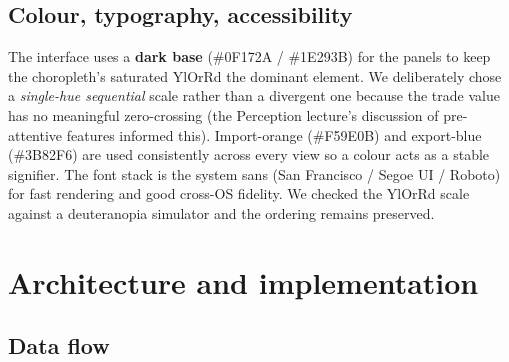 \documentclass[a4paper,10pt]{article}
\begin{document}
\subsection{Colour, typography, accessibility}

The interface uses a \textbf{dark base} (\#0F172A / \#1E293B) for the panels
to keep the choropleth's saturated YlOrRd the dominant element. We deliberately
chose a \emph{single-hue sequential} scale rather than a divergent one because
the trade value has no meaningful zero-crossing (the Perception lecture's
discussion of pre-attentive features informed this). Import-orange
(\#F59E0B) and export-blue (\#3B82F6) are used consistently across every
view so a colour acts as a stable signifier. The font stack is the system
sans (San Francisco / Segoe UI / Roboto) for fast rendering and good cross-OS
fidelity. We checked the YlOrRd scale against a deuteranopia simulator and
the ordering remains preserved.

\newpage

\section{Architecture and implementation}

\subsection{Data flow}
\end{document}
